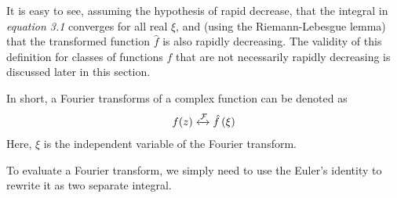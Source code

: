 \documentclass[12pt]{book}
\newcommand{\paren}[1]{\left( #1 \right)}
\begin{document}
It is easy to see, assuming the hypothesis of rapid decrease, that the integral in \textit{equation 3.1} converges for all real \( \xi \), and (using the Riemann-Lebesgue lemma) that the transformed function \( \hat{f} \) is also rapidly decreasing. The validity of this definition for classes of functions \( f \) that are not necessarily rapidly decreasing is discussed later in this section.

In short, a Fourier transforms of a complex function can be denoted as
\begin{align}
    f(z) \xleftrightarrow{\mathcal{F}} \hat{f}\paren{\xi}
\end{align}
Here, $\xi$ is the independent variable of the Fourier transform. 

To evaluate a Fourier transform, we simply need to use the Euler's identity to rewrite it as two separate integral. 
\end{document}
